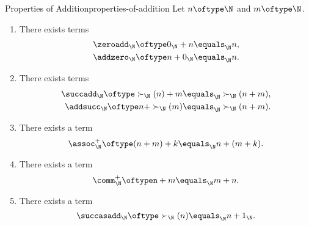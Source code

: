 \begin{proposition}{Properties of Addition}{properties-of-addition}%
    Let $n\oftype\N$ and $m\oftype\N$.
    \begin{enumerate}
        \item\label{properties-of-addition-unitality}There exists terms
            \begin{align*}
                \zeroadd_{\N}\oftype 0_{\N}+n\equals_{\N}n,\\
                \addzero_{\N}\oftype n+0_{\N}\equals_{\N}n.
            \end{align*}
        \item\label{properties-of-addition-interaction-with-successors}There exists terms
            \begin{align*}
                \succadd_{\N}\oftype \succ_{\N}(n)+m\equals_{\N}\succ_{\N}(n+m),\\
                \addsucc_{\N}\oftype n+\succ_{\N}(m)\equals_{\N}\succ_{\N}(n+m).
            \end{align*}
        \item\label{properties-of-addition-associativity}There exists a term
            \[
                \assoc^{+}_{\N}%
                \oftype%
                (n+m)+k%
                \equals_{\N}
                n+(m+k).%
            \]%
        \item\label{properties-of-addition-commutativity}There exists a term
            \[
                \comm^{+}_{\N}%
                \oftype%
                n+m%
                \equals_{\N}%
                m+n.%
            \]%
        \item\label{properties-of-addition-successors-via-addition}There exists a term
            \[
                \succasadd_{\N}%
                \oftype%
                \succ_{\N}(n)%
                \equals_{\N}%
                n+1_{\N}.%
            \]%
    \end{enumerate}
\end{proposition}
